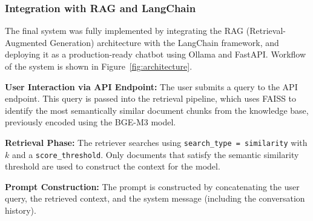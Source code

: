 \documentclass[conference]{IEEEtran}
\begin{document}
\subsubsection{Integration with RAG and LangChain}

The final system was fully implemented by integrating the RAG (Retrieval-Augmented Generation) architecture with the LangChain framework, and deploying it as a production-ready chatbot using Ollama and FastAPI. Workflow of the system is shown in Figure~\ref{fig:architecture}.

\noindent\textbf{User Interaction via API Endpoint:}
The user submits a query to the API endpoint. This query is passed into the retrieval pipeline, which uses FAISS to identify the most semantically similar document chunks from the knowledge base, previously encoded using the BGE-M3 model.

\noindent\textbf{Retrieval Phase:}
The retriever searches using \texttt{search\_type = similarity} with $k$ and a \texttt{score\_threshold}. Only documents that satisfy the semantic similarity threshold are used to construct the context for the model.

\noindent\textbf{Prompt Construction:}
The prompt is constructed by concatenating the user query, the retrieved context, and the system message (including the conversation history).
\end{document}
